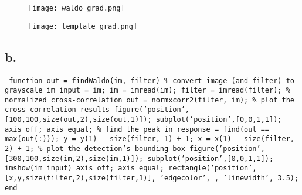 \documentclass{article}
\begin{document}
\begin{figure}[h!]
\centering
\texttt{[image: waldo\_grad.png]}
\label{fig:sample graph}
\end{figure}

\begin{figure}[h!]
\centering
\texttt{[image: template\_grad.png]}
\label{fig:sample graph}
\end{figure}

\newpage

\subsection*{b.}

\texttt{\noindent
function out = findWaldo(im, filter)
\newline\indent
\% convert image (and filter) to grayscale
\newline\indent
im\_input = im;
\newline\indent
im = imread(im);
\newline\indent
filter = imread(filter);
\newline\newline\indent
\% normalized cross-correlation
\newline\indent
out = normxcorr2(filter, im);
\newline\newline\indent
\% plot the cross-correlation results
\newline\indent
figure('position', [100,100,size(out,2),size(out,1)]);
\newline\indent
subplot('position',[0,0,1,1]);
\newline\indent
axis off;
\newline\indent
axis equal;
\newline\newline\indent
\% find the peak in response
\newline\indent
[y,x] = find(out == max(out(:)));
\newline\indent
y = y(1) - size(filter, 1) + 1;
\newline\indent
x = x(1) - size(filter, 2) + 1;
\newline\newline\indent
\% plot the detection's bounding box
\newline\indent
figure('position', [300,100,size(im,2),size(im,1)]);
\newline\indent
subplot('position',[0,0,1,1]);
\newline\indent
imshow(im\_input)
\newline\indent
axis off;
\newline\indent
axis equal;
\newline\indent
rectangle('position', [x,y,size(filter,2),size(filter,1)], 'edgecolor',
\newline\indent
[0.1,0.2,1], 'linewidth', 3.5);
\newline
end
}
\end{document}
